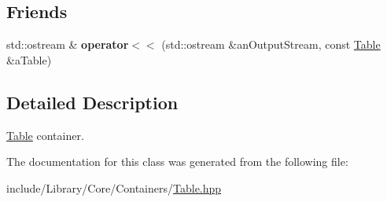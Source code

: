 \subsection*{Friends}
\begin{DoxyCompactItemize}
\item 
\mbox{\label{classlibrary_1_1core_1_1ctnr_1_1_table_afaece709b2f143e4011941ae67b7adba}} 
std\+::ostream \& {\bfseries operator$<$$<$} (std\+::ostream \&an\+Output\+Stream, const \hyperlink{classlibrary_1_1core_1_1ctnr_1_1_table}{Table} \&a\+Table)
\end{DoxyCompactItemize}


\subsection{Detailed Description}
\hyperlink{classlibrary_1_1core_1_1ctnr_1_1_table}{Table} container. 

The documentation for this class was generated from the following file\+:\begin{DoxyCompactItemize}
\item 
include/\+Library/\+Core/\+Containers/\hyperlink{_table_8hpp}{Table.\+hpp}\end{DoxyCompactItemize}
